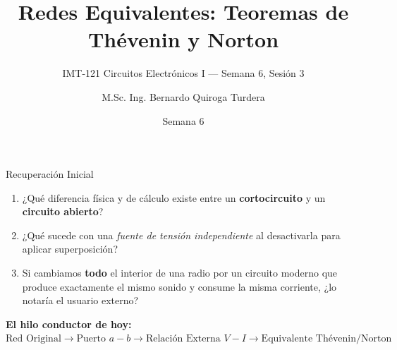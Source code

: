 \documentclass[aspectratio=169, table, xcdraw]{beamer}
\title[Thévenin y Norton]{Redes Equivalentes: Teoremas de Thévenin y Norton}
\subtitle{IMT-121 Circuitos Electrónicos I — Semana 6, Sesión 3}
\author[B. Quiroga Turdera]{M.Sc. Ing. Bernardo Quiroga Turdera}
\institute[UCB Tarija]{Universidad Católica Boliviana ``San Pablo'' — Sede Tarija}
\date{Semana 6}
\begin{document}
\begin{frame}
    \titlepage
\end{frame}

\begin{frame}{Recuperación Inicial}
    \begin{tcolorbox}[colback=ucbblue!5, colframe=ucbblue, title=Diagnóstico Rápido]
        \begin{enumerate}
            \item ¿Qué diferencia física y de cálculo existe entre un \textbf{cortocircuito} y un \textbf{circuito abierto}?
            \item ¿Qué sucede con una \textit{fuente de tensión independiente} al desactivarla para aplicar superposición?
            \item Si cambiamos \textbf{todo} el interior de una radio por un circuito moderno que produce exactamente el mismo sonido y consume la misma corriente, ¿lo notaría el usuario externo?
        \end{enumerate}
    \end{tcolorbox}
    \vspace{0.4cm}
    \textbf{El hilo conductor de hoy:} \\
    $\text{Red Original} \rightarrow \text{Puerto } a-b \rightarrow \text{Relación Externa } V-I \rightarrow \text{Equivalente Thévenin/Norton}$
\end{frame}
\end{document}
